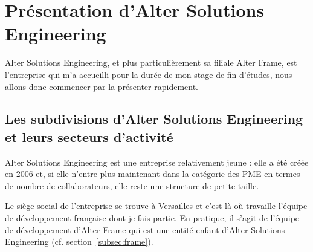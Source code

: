 \section{Présentation d'Alter Solutions Engineering}
Alter Solutions Engineering, et plus particulièrement sa filiale Alter Frame, est l'entreprise qui m'a accueilli pour la durée de mon stage de fin d'études, nous allons donc commencer par la présenter rapidement.

\subsection{Les subdivisions d'Alter Solutions Engineering et leurs secteurs d'activité}
Alter Solutions Engineering est une entreprise relativement jeune : elle a été créée en 2006 et, si elle n'entre plus maintenant dans la catégorie des PME en termes de nombre de collaborateurs, elle reste une structure de petite taille.

Le siège social de l'entreprise se trouve à Versailles et c'est là où travaille l'équipe de développement française dont je fais partie. En pratique, il s'agit de l'équipe de développement d'Alter Frame qui est une entité enfant d'Alter Solutions Engineering (cf. section~\ref{subsec:frame}).

